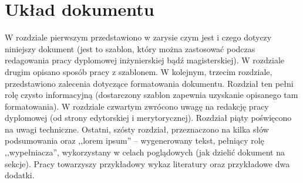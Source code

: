 \section{Układ dokumentu}
W rozdziale pierwszym przedstawiono w zarysie czym jest i czego dotyczy niniejszy dokument (jest to szablon, który można zastosować podczas redagowania pracy dyplomowej inżynierskiej bądź magisterskiej). W rozdziale drugim opisano sposób pracy z szablonem. W kolejnym, trzecim rozdziale, przedstawiono zalecenia dotyczące formatowania dokumentu. Rozdział ten pełni rolę czysto informacyjną (dostarczony szablon zapewnia uzyskanie opisanego tam formatowania).
W rozdziale czwartym zwrócono uwagę na redakcję pracy dyplomowej (od strony edytorskiej i merytorycznej).
Rozdział piąty poświęcono na uwagi techniczne. Ostatni, szósty rozdział, przeznaczono na kilka słów podsumowania oraz ,,lorem ipsum'' -- wygenerowany tekst, pełniący rolę ,,wypełniacza'', wykorzystany w celach poglądowych (jak dzielić dokument na sekcje).
Pracy towarzyszy przykładowy wykaz literatury oraz przykładowe dwa dodatki. 

